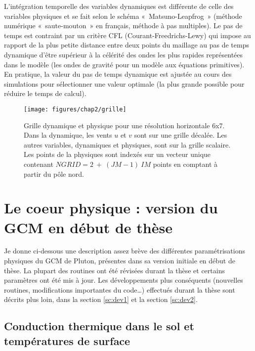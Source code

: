 L’intégration temporelle des variables dynamiques est différente de celle des variables physiques et se fait selon le schéma «~Matsuno-Leapfrog~» (méthode numérique «~saute-mouton~» en français,  méthode à pas multiples). Le pas de temps est contraint par un critère CFL (Courant-Freedrichs-Lewy) qui impose au rapport de la plus petite distance entre deux points du maillage au pas de temps dynamique d’être supérieur à la célérité des ondes les plus rapides représentées dans le modèle (les ondes de gravité pour un modèle aux équations primitives). En pratique, la valeur du pas de temps dynamique est ajustée au cours des simulations pour sélectionner une valeur optimale (la plus grande possible pour réduire le temps de calcul). 

\begin{figure}[!h]
\begin{center} 
	\texttt{[image: figures/chap2/grille]}
\end{center} 
\caption{Grille dynamique et physique pour une résolution horizontale 6x7. Dans la dynamique, les vents $u$ et $v$ sont sur une grille décalée. Les autres variables, dynamiques et physiques, sont sur la grille scalaire. Les points de la physiques sont indexés sur un vecteur unique contenant $NGRID=2~+~ (JM-1)~IM$ points en comptant à partir du pôle nord.} 
\label{grille}
\end{figure}

\section{Le coeur physique : version du GCM en début de thèse}
\label{sc:physic}

Je donne ci-dessous une description assez brève des différentes paramétrisations physiques du GCM de Pluton, présentes dans sa version initiale en début de thèse. La plupart des routines ont été révisées durant la thèse et certains paramètres ont été mis à jour. Les développements plus conséquents (nouvelles routines, modifications importantes du code…) effectués durant la thèse sont décrits plus loin, dans la section \ref{sc:dev1} et la section \ref{sc:dev2}. 

\subsection{Conduction thermique dans le sol et températures de surface}
\label{sc:condsoil}


